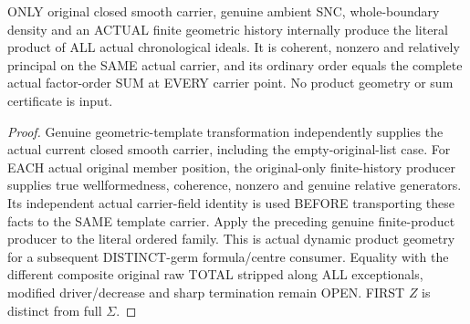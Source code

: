 \begin{theorem}
\label{hir:sharp-original-chronological-full-product-geometry-order-sum}
\leanok
ONLY original closed smooth carrier, genuine ambient SNC, whole-boundary
density and an ACTUAL finite geometric history internally produce the
literal product of ALL actual chronological ideals. It is coherent,
nonzero and relatively principal on the SAME actual carrier, and its
ordinary order equals the complete actual factor-order SUM at EVERY
carrier point. No product geometry or sum certificate is input.
\end{theorem}
\begin{proof}
Genuine geometric-template transformation independently supplies the actual
current closed smooth carrier, including the empty-original-list case.
For EACH actual original member position, the original-only finite-history
producer supplies true wellformedness, coherence, nonzero and genuine
relative generators. Its independent actual carrier-field identity is used
BEFORE transporting these facts to the SAME template carrier. Apply the
preceding genuine finite-product producer to the literal ordered family.
This is actual dynamic product geometry for a subsequent DISTINCT-germ
formula/centre consumer. Equality with the different composite original raw
TOTAL stripped along ALL exceptionals, modified driver/decrease and sharp
termination remain OPEN. FIRST $Z$ is distinct from full $\Sigma$.
\end{proof}
